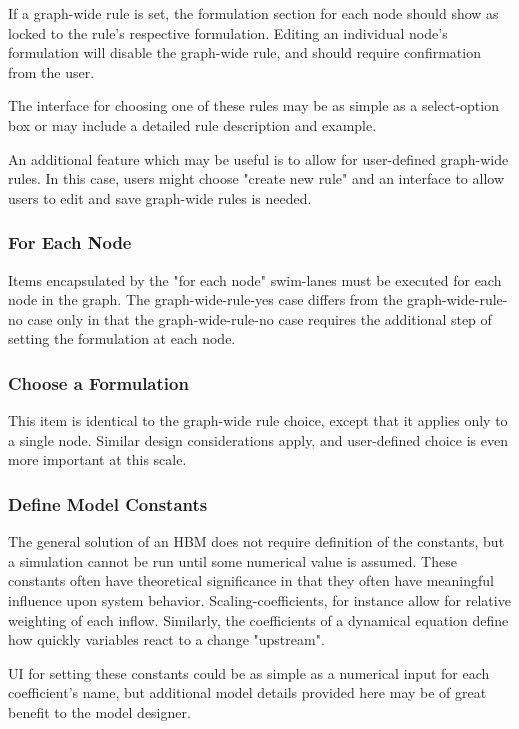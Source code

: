 \documentclass[conference]{IEEEtran}
\begin{document}
If a graph-wide rule is set, the formulation section for each node should show as locked to the rule's respective formulation. 
Editing an individual node's formulation will disable the graph-wide rule, and should require confirmation from the user. 

The interface for choosing one of these rules may be as simple as a select-option box or may include a detailed rule description and example. 

An additional feature which may be useful is to allow for user-defined graph-wide rules. 
In this case, users might choose "create new rule" and an interface to allow users to edit and save graph-wide rules is needed.

\subsubsection{For Each Node}

Items encapsulated by the "for each node" swim-lanes must be executed for each node in the graph. 
The graph-wide-rule-yes case differs from the graph-wide-rule-no case only in that the graph-wide-rule-no case requires the additional step of setting the formulation at each node.

\subsubsection{Choose a Formulation}
This item is identical to the graph-wide rule choice, except that it applies only to a single node. Similar design considerations apply, and user-defined choice is even more important at this scale.

\subsubsection{Define Model Constants}
The general solution of an HBM does not require definition of the constants, but a simulation cannot be run until some numerical value is assumed. 
These constants often have theoretical significance in that they often have meaningful influence upon system behavior. 
Scaling-coefficients, for instance allow for relative weighting of each inflow. 
Similarly, the coefficients of a dynamical equation define how quickly variables react to a change "upstream". 

UI for setting these constants could be as simple as a numerical input for each coefficient's name, but additional model details provided here may be of great benefit to the model designer. 
\end{document}
